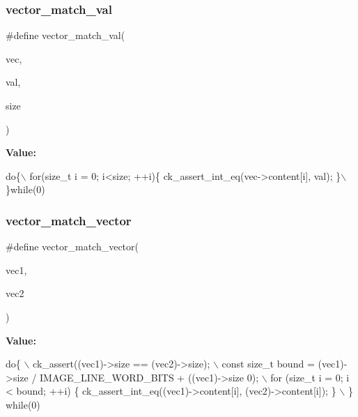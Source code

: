 \subsubsection{\texorpdfstring{vector\+\_\+match\+\_\+val}{vector\_match\_val}}
{\footnotesize\ttfamily \#define vector\+\_\+match\+\_\+val(\begin{DoxyParamCaption}\item[{}]{vec,  }\item[{}]{val,  }\item[{}]{size }\end{DoxyParamCaption})}

{\bfseries Value\+:}
\begin{DoxyCode}
\textcolor{keywordflow}{do}\{\(\backslash\)
        for(\textcolor{keywordtype}{size\_t} i = 0; i<size; ++i)\{ ck\_assert\_int\_eq(vec->content[i], val); \}\(\backslash\)
    \}\textcolor{keywordflow}{while}(0)
\end{DoxyCode}
\mbox{\label{unit-test-bit-vector_8c_adc8d3dd6f0c37c44171f5c4738e15ca2}} 
\subsubsection{\texorpdfstring{vector\+\_\+match\+\_\+vector}{vector\_match\_vector}}
{\footnotesize\ttfamily \#define vector\+\_\+match\+\_\+vector(\begin{DoxyParamCaption}\item[{}]{vec1,  }\item[{}]{vec2 }\end{DoxyParamCaption})}

{\bfseries Value\+:}
\begin{DoxyCode}
\textcolor{keywordflow}{do}\{ \(\backslash\)
      ck\_assert((vec1)->size == (vec2)->size); \(\backslash\)
      const \textcolor{keywordtype}{size\_t} bound = (vec1)->size / IMAGE\_LINE\_WORD\_BITS + ((vec1)->size %
      0); \(\backslash\)
      for (\textcolor{keywordtype}{size\_t} i = 0; i < bound; ++i) \{ ck\_assert\_int\_eq((vec1)->content[i], (vec2)->content[i]); \} \(\backslash\)
    \} \textcolor{keywordflow}{while}(0)
\end{DoxyCode}
